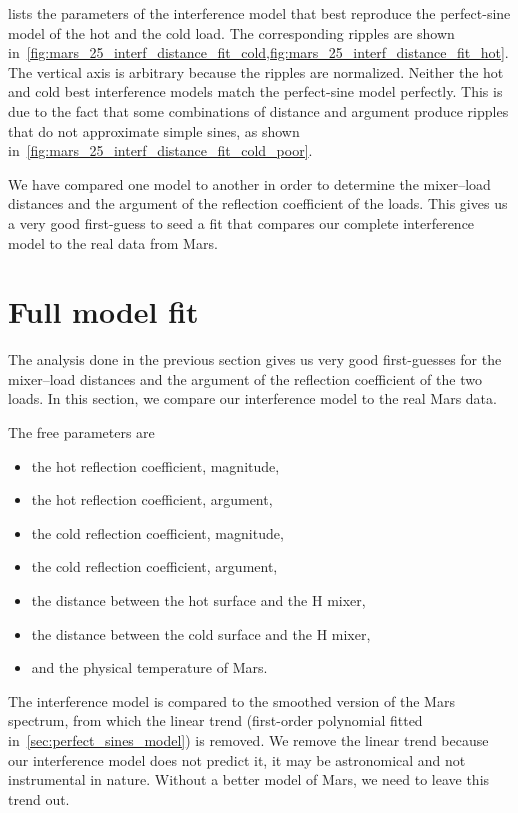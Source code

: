  lists the parameters of the interference model that best reproduce the perfect-sine model of the hot and the cold load.
The corresponding ripples are shown in~\cref{fig:mars_25_interf_distance_fit_cold,fig:mars_25_interf_distance_fit_hot}.
The vertical axis is arbitrary because the ripples are normalized.
Neither the hot and cold best interference models match the perfect-sine model perfectly.
This is due to the fact that some combinations of distance and argument produce ripples that do not approximate simple sines, as shown in~\cref{fig:mars_25_interf_distance_fit_cold_poor}.



We have compared one model to another in order to determine the mixer--load distances
and the argument of the reflection coefficient of the loads.
This gives us a very good first-guess to seed a fit that compares our complete interference model to the real data from Mars.






\section{Full model fit}
The analysis done in the previous section gives us very good first-guesses for the mixer--load distances and the argument of the reflection coefficient of the two loads.
In this section, we compare our interference model to the real Mars data.

The free parameters are
\begin{itemize}[noitemsep,nolistsep]
    \item the hot reflection coefficient, magnitude,
    \item the hot reflection coefficient, argument,
    \item the cold reflection coefficient, magnitude,
    \item the cold reflection coefficient, argument,
    \item the distance between the hot surface and the H mixer,
    \item the distance between the cold surface and the H mixer,
    \item and the physical temperature of Mars.
\end{itemize}

The interference model is compared to the smoothed version of the Mars spectrum, from which the linear trend (first-order polynomial fitted in~\cref{sec:perfect_sines_model}) is removed.
We remove the linear trend because our interference model does not predict it, it may be astronomical and not instrumental in nature.
Without a better model of Mars, we need to leave this trend out.

